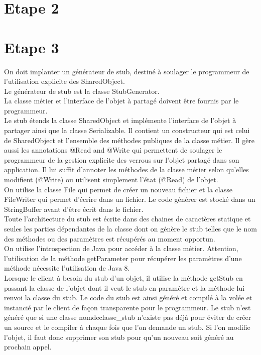 \documentclass[a4paper,12pt]{article}
\begin{document}
\clearpage
\section{Etape 2}


\clearpage
\section{Etape 3}

\bigskip
\bigskip

On doit  implanter un générateur de stub, destiné à soulager le programmeur de l'utilisation explicite des SharedObject. \\

Le générateur de stub est la classe StubGenerator.\\
La classe métier et l'interface de l'objet à partagé doivent être fournis par le programmeur.\\

Le stub étends la classe SharedObject et implémente l'interface de l'objet à partager ainsi que la classe Serializable.
Il contient un constructeur qui est celui de SharedObject et l'ensemble des méthodes publiques de la classe métier.
Il gère aussi les annotations @Read and @Write qui permettent de soulager le programmeur de la gestion explicite des verrous sur l'objet partagé dans son application. Il lui suffit d'annoter les méthodes de la classe métier selon qu'elles modifient (@Write) ou utilisent simplement l'état (@Read) de l'objet. \\

On utilise la classe File qui permet de créer un nouveau fichier et la classe FileWriter qui permet d'écrire dans un fichier. Le code générer est stocké dans un StringBuffer avant d'être écrit dans le fichier.\\
Toute l'architecture du stub est écrite dans des chaines de caractères statique et seules les parties dépendantes de la classe dont on génère le stub telles que le nom des méthodes ou des paramètres est récupérés au moment opportun.\\
 On utilise l'introspection de Java pour accéder à la classe métier. Attention, l'utilisation de la méthode getParameter pour récupérer les paramètres d'une méthode nécessite l'utilisation de Java 8.\\

Lorsque le client à besoin du stub d'un objet, il utilise la méthode getStub en passant la classe de l'objet dont il veut le stub en paramètre et la méthode lui renvoi la classe du stub. Le code du stub est ainsi généré et compilé à la volée et instancié par le client de façon transparente pour le programmeur. Le stub n'est généré que si une classe nomdeclasse\_stub n'existe pas déjà pour éviter de créer un source et le compiler à chaque fois que l'on demande un stub. Si l'on modifie l'objet, il faut donc supprimer son stub pour qu'un nouveau soit généré au prochain appel.\\
\end{document}
